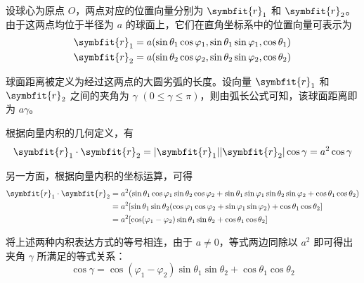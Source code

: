\begin{myproof}
    设球心为原点 $O$，两点对应的位置向量分别为 $\symbfit{r}_1$ 和 $\symbfit{r}_2$。由于这两点均位于半径为 $a$ 的球面上，它们在直角坐标系中的位置向量可表示为
    \begin{equation*}
        \begin{aligned}
            \symbfit{r}_1 & = a (\sin\theta_1 \cos\varphi_1, \sin\theta_1 \sin\varphi_1, \cos\theta_1) \\
            \symbfit{r}_2 & = a (\sin\theta_2 \cos\varphi_2, \sin\theta_2 \sin\varphi_2, \cos\theta_2)
        \end{aligned}
    \end{equation*}

    球面距离被定义为经过这两点的大圆劣弧的长度。设向量 $\symbfit{r}_1$ 和 $\symbfit{r}_2$ 之间的夹角为 $\gamma$ $(0 \leqslant \gamma \leqslant \pi)$，则由弧长公式可知，该球面距离即为 $a\gamma$。

    根据向量内积的几何定义，有
    \begin{equation*}
        \symbfit{r}_1 \cdot \symbfit{r}_2 = |\symbfit{r}_1| |\symbfit{r}_2| \cos\gamma = a^2 \cos\gamma
    \end{equation*}

    另一方面，根据向量内积的坐标运算，可得
    \begin{equation*}
        \begin{aligned}
            \symbfit{r}_1 \cdot \symbfit{r}_2 & = a^2 (\sin\theta_1 \cos\varphi_1 \sin\theta_2 \cos\varphi_2 + \sin\theta_1 \sin\varphi_1 \sin\theta_2 \sin\varphi_2 + \cos\theta_1 \cos\theta_2) \\
                                              & = a^2 [\sin\theta_1 \sin\theta_2 (\cos\varphi_1 \cos\varphi_2 + \sin\varphi_1 \sin\varphi_2) + \cos\theta_1 \cos\theta_2]                         \\
                                              & = a^2 [\cos(\varphi_1 - \varphi_2) \sin\theta_1 \sin\theta_2 + \cos\theta_1 \cos\theta_2]
        \end{aligned}
    \end{equation*}

    将上述两种内积表达方式的等号相连，由于 $a \neq 0$，等式两边同除以 $a^2$ 即可得出夹角 $\gamma$ 所满足的等式关系：
    \begin{equation*}
        \boxed{\cos\gamma = \cos(\varphi_1 - \varphi_2) \sin\theta_1 \sin\theta_2 + \cos\theta_1 \cos\theta_2}
    \end{equation*}
\end{myproof}

